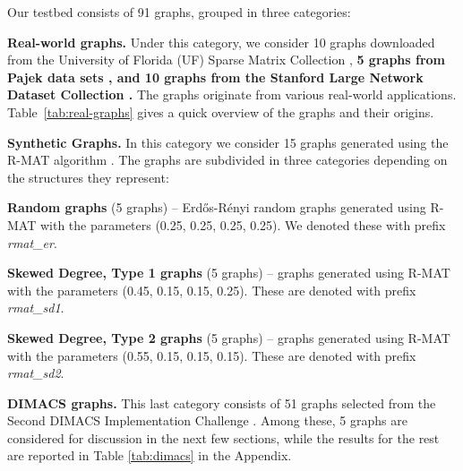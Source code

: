 Our testbed consists of 91 graphs, grouped in three categories:\\
\begin{enumerate*}[label=\textbf{\arabic*})]
\item {\bf Real-world graphs. } 
Under this category, we consider 10 graphs downloaded from the 
University of Florida (UF) Sparse Matrix Collection  \cite{Davis97theuniversity}, {\bf 5 graphs from Pajek data sets \cite{pajek2006}, and 10 graphs from the Stanford Large Network Dataset Collection \cite{stanford_dataset}.}
The graphs originate
from various real-world applications. 
Table~\ref{tab:real-graphs} gives a quick overview of the graphs and their origins.\\


\item {\bf Synthetic Graphs. } 
In this category we consider 15 graphs generated using 
the R-MAT algorithm \cite{Chakrabarti:2006:GML:1132952.1132954}. The graphs
are subdivided in three categories depending on the structures they represent:\\

\begin{enumerate*}[label=\textbf{\alph*})]
\item {\bf Random graphs} (5 graphs) -- Erd\H{o}s-R\'{e}nyi random  graphs generated using R-MAT with the parameters (0.25, 0.25, 0.25, 0.25).  We denoted these with prefix {\it rmat\_er}.\\
\item {\bf Skewed Degree, Type 1 graphs} (5 graphs) -- graphs generated using R-MAT with the parameters (0.45, 0.15, 0.15, 0.25). These are denoted with prefix {\it rmat\_sd1}.\\
\item {\bf Skewed Degree, Type 2 graphs} (5 graphs) --  graphs generated using R-MAT with the parameters (0.55, 0.15, 0.15, 0.15). These are denoted with prefix {\it rmat\_sd2}.\\
\end{enumerate*}

\item {\bf DIMACS graphs. } 
This last category consists of 51 graphs selected from the Second DIMACS Implementation Challenge \cite{dimacs}. Among these, 5 graphs are considered for discussion in the next few sections, while the results for the rest are reported in Table \ref{tab:dimacs} in the Appendix.
\end{enumerate*}

